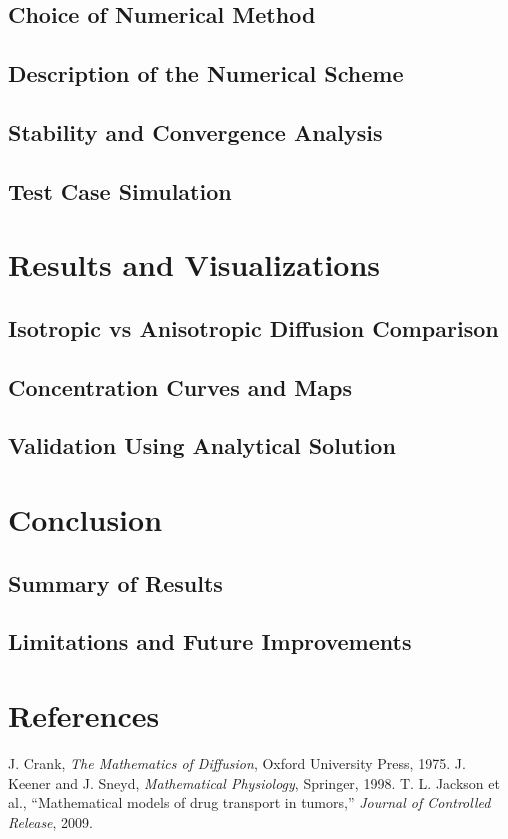 \documentclass[11pt, a4paper]{article}
\begin{document}
\subsection{Choice of Numerical Method}
\subsection{Description of the Numerical Scheme}
\subsection{Stability and Convergence Analysis}
\subsection{Test Case Simulation}

\section{Results and Visualizations}
\subsection{Isotropic vs Anisotropic Diffusion Comparison}
\subsection{Concentration Curves and Maps}
\subsection{Validation Using Analytical Solution}

\section{Conclusion}
\subsection{Summary of Results}
\subsection{Limitations and Future Improvements}

\section*{References}
\begin{thebibliography}{9}
 J. Crank, \textit{The Mathematics of Diffusion}, Oxford University Press, 1975.
 J. Keener and J. Sneyd, \textit{Mathematical Physiology}, Springer, 1998.
 T. L. Jackson et al., “Mathematical models of drug transport in tumors,” \textit{Journal of Controlled Release}, 2009.
\end{thebibliography}
\end{document}
